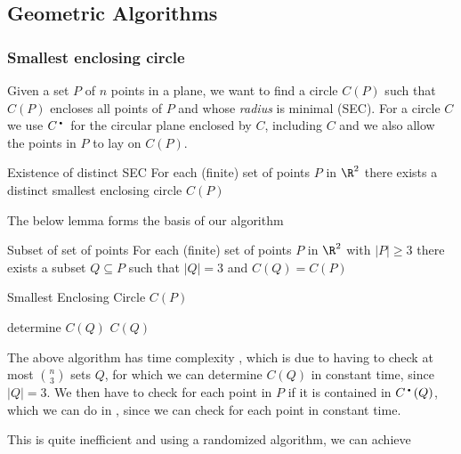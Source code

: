 \newpage
\subsection{Geometric Algorithms}

\subsubsection{Smallest enclosing circle}
\newcommand{\cplane}{C^\text{\textbullet}}
Given a set $P$ of $n$ points in a plane, we want to find a circle $C(P)$ such that $C(P)$ encloses all points of $P$ and whose \textit{radius} is minimal (SEC).
For a circle $C$ we use $\cplane$ for the circular plane enclosed by $C$, including $C$ and we also allow the points in $P$ to lay on $C(P)$.
\begin{lemma}[]{Existence of distinct SEC}
    For each (finite) set of points $P$ in $\R^2$ there exists a distinct smallest enclosing circle $C(P)$
\end{lemma}

The below lemma forms the basis of our algorithm
\begin{lemma}[]{Subset of set of points}
    For each (finite) set of points $P$ in $\R^2$ with $|P| \geq 3$ there exists a subset $Q \subseteq P$ such that $|Q| = 3$ and $C(Q) = C(P)$
\end{lemma}

\begin{algorithm}
    \caption{Smallest Enclosing Circle $C(P)$}
    \begin{algorithmic}[1]
                \State determine $C(Q)$
                \If{$P \subseteq \cplane(Q)$}
                    \State \Return $C(Q)$
                \EndIf
            \EndFor
        \EndProcedure
    \end{algorithmic}
\end{algorithm}
The above algorithm has time complexity , which is due to having to check at most ${n \choose 3}$ sets $Q$, for which we can determine $C(Q)$ in constant time, since $|Q| = 3$. We then have to check for each point in $P$ if it is contained in $\cplane(Q)$, which we can do in , since we can check for each point in constant time.

This is quite inefficient and using a randomized algorithm, we can achieve 

